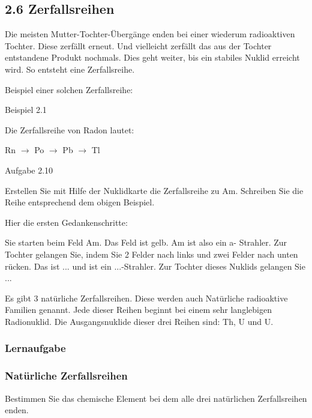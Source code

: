 \documentclass[12pt,a4paper,twoside]{article}
\begin{document}
\bigskip

\subsection[2.6 Zerfallsreihen]{2.6 Zerfallsreihen}

\bigskip

Die meisten Mutter-Tochter-Übergänge enden bei einer wiederum radioaktiven Tochter. Diese zerfällt erneut. Und vielleicht zerfällt das aus der Tochter entstandene Produkt nochmals. Dies geht weiter, bis ein stabiles Nuklid erreicht wird. So entsteht eine Zerfallsreihe.

Beispiel einer solchen Zerfallsreihe: 

Beispiel 2.1

Die Zerfallsreihe von Radon lautet:

Rn ${\rightarrow}$ Po ${\rightarrow}$ Pb ${\rightarrow}$ Tl

Aufgabe 2.10

Erstellen Sie mit Hilfe der Nuklidkarte die Zerfallsreihe zu Am. Schreiben Sie die Reihe entsprechend dem obigen Beispiel.

Hier die ersten Gedankenschritte:

Sie starten beim Feld Am. Das Feld ist gelb. Am ist also ein a\nobreakdash- Strahler. Zur Tochter gelangen Sie, indem Sie 2 Felder nach links und zwei Felder nach unten rücken. Das ist ... und ist ein ...\nobreakdash-Strahler. Zur Tochter dieses Nuklids gelangen Sie ...


\bigskip

Es gibt 3 natürliche Zerfallsreihen. Diese werden auch {\quotedblbase}Natürliche radioaktive Familien{\quotedblbase} genannt. Jede dieser Reihen beginnt bei einem sehr langlebigen Radionuklid. Die Ausgangsnuklide dieser drei Reihen sind: Th, U und U.

\subsubsection*{Lernaufgabe}
\subsubsection*{Natürliche Zerfallsreihen}
Bestimmen Sie das chemische Element bei dem alle drei natürlichen Zerfallsreihen enden.
\end{document}

